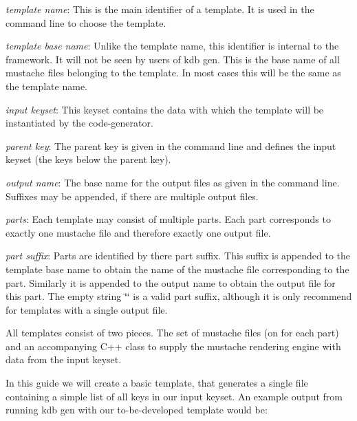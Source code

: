 \begin{DoxyItemize}
\item {\itshape template name}\+: This is the main identifier of a template. It is used in the command line to choose the template.
\item {\itshape template base name}\+: Unlike the template name, this identifier is internal to the framework. It will not be seen by users of {\ttfamily kdb gen}. This is the base name of all mustache files belonging to the template. In most cases this will be the same as the template name.
\item {\itshape input keyset}\+: This keyset contains the data with which the template will be instantiated by the code-\/generator.
\item {\itshape parent key}\+: The parent key is given in the command line and defines the input keyset (the keys below the parent key).
\item {\itshape output name}\+: The base name for the output files as given in the command line. Suffixes may be appended, if there are multiple output files.
\item {\itshape parts}\+: Each template may consist of multiple parts. Each part corresponds to exactly one mustache file and therefore exactly one output file.
\item {\itshape part suffix}\+: Parts are identified by there part suffix. This suffix is appended to the template base name to obtain the name of the mustache file corresponding to the part. Similarly it is appended to the output name to obtain the output file for this part. The empty string {\ttfamily \char`\"{}\char`\"{}} is a valid part suffix, although it is only recommend for templates with a single output file.
\end{DoxyItemize}

All templates consist of two pieces. The set of mustache files (on for each part) and an accompanying C++ class to supply the mustache rendering engine with data from the input keyset.

In this guide we will create a basic template, that generates a single file containing a simple list of all keys in our input keyset. An example output from running {\ttfamily kdb gen} with our to-\/be-\/developed template would be\+:




